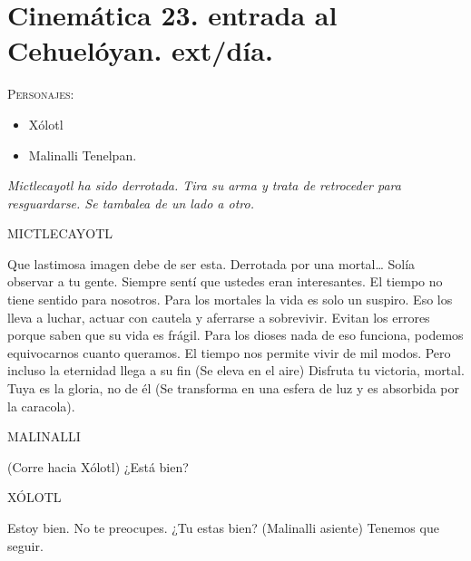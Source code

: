 \documentclass[11pt,letterpaper]{article}
\begin{document}
\section{Cinemática 23. entrada al Cehuelóyan. ext/día.}
\textsc{Personajes}:
\begin{itemize}
\item Xólotl
\item Malinalli Tenelpan.
\end{itemize}
\textit{Mictlecayotl ha sido derrotada. Tira su arma y trata de retroceder para resguardarse. Se tambalea de un lado a otro.}
\begin{center}
MICTLECAYOTL
\\
\par
Que lastimosa imagen debe de ser esta. Derrotada por una mortal… Solía observar a tu gente. Siempre sentí que ustedes eran interesantes. El tiempo no tiene sentido para nosotros. Para los mortales la vida es solo un suspiro. Eso los lleva a luchar, actuar con cautela y aferrarse a sobrevivir. Evitan los errores porque saben que su vida es frágil. Para los dioses nada de eso funciona, podemos equivocarnos cuanto queramos. El tiempo nos permite vivir de mil modos. Pero incluso la eternidad llega a su fin (Se eleva en el aire) Disfruta tu victoria, mortal. Tuya es la gloria, no de él (Se transforma en una esfera de luz y es absorbida por la caracola).
\\
\par
 MALINALLI
 \\
\par
(Corre hacia Xólotl) ¿Está bien?
\\
\par
XÓLOTL
\\
\par
Estoy bien. No te preocupes. ¿Tu estas bien? (Malinalli asiente) Tenemos que seguir.
\end{center}
\end{document}

